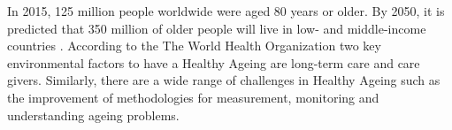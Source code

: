 \documentclass[12pt,journal,onecolumn,compsoc]{IEEEtran}
\begin{document}
 
In 2015, 125 million people worldwide were aged 80 years or older.
By 2050, it is predicted that 350 million of older people will live in low- and middle-income countries \cite{AH16}. 
According to the The World Health Organization
two  key environmental factors to have a Healthy Ageing are long-term care and care givers.
Similarly, 
there are a wide range of challenges in Healthy Ageing
such as the improvement of methodologies for measurement, monitoring and understanding ageing problems.


\end{document}
